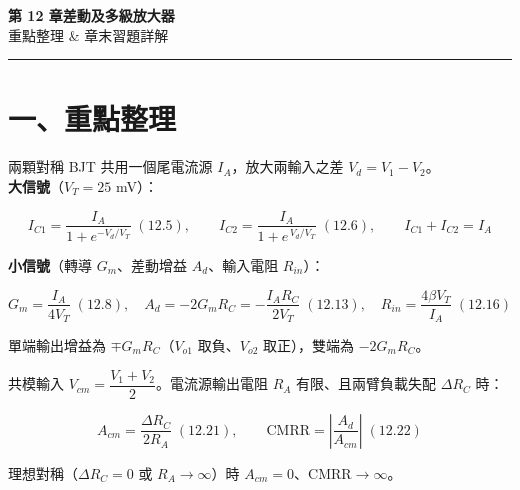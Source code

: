 \documentclass[12pt]{article}
\begin{document}
\begin{center}
{\Huge\bfseries\color{maincol} 第 12 章\quad 差動及多級放大器}\\[0.4em]
{\large\color{keycol} 重點整理 \;\&\; 章末習題詳解}
\end{center}
\vspace{0.4em}\hrule\vspace{1em}

\section*{一、重點整理}

\begin{keybox}
兩顆對稱 BJT 共用一個尾電流源 $I_A$，放大兩輸入之差 $V_d=V_1-V_2$。\\
\textbf{大信號}（$V_T=25$ mV）：
\begin{formulabox}
\[ I_{C1}=\frac{I_A}{1+e^{-V_d/V_T}}\;(12.5),\qquad
   I_{C2}=\frac{I_A}{1+e^{\,V_d/V_T}}\;(12.6),\qquad I_{C1}+I_{C2}=I_A \]
\end{formulabox}
\textbf{小信號}（轉導 $G_m$、差動增益 $A_d$、輸入電阻 $R_{in}$）：
\begin{formulabox}
\[ G_m=\frac{I_A}{4V_T}\;(12.8),\quad
   A_d=-2G_mR_C=-\frac{I_AR_C}{2V_T}\;(12.13),\quad
   R_{in}=\frac{4\beta V_T}{I_A}\;(12.16) \]
\end{formulabox}
單端輸出增益為 $\mp G_mR_C$（$V_{o1}$ 取負、$V_{o2}$ 取正），雙端為 $-2G_mR_C$。
\end{keybox}

\begin{keybox}
共模輸入 $V_{cm}=\dfrac{V_1+V_2}{2}$。電流源輸出電阻 $R_A$ 有限、且兩臂負載失配 $\Delta R_C$ 時：
\begin{formulabox}
\[ A_{cm}=\frac{\Delta R_C}{2R_A}\;(12.21),\qquad
   \mathrm{CMRR}=\left|\frac{A_d}{A_{cm}}\right|\;(12.22) \]
\end{formulabox}
理想對稱（$\Delta R_C=0$ 或 $R_A\to\infty$）時 $A_{cm}=0$、CMRR$\to\infty$。
\end{keybox}
\end{document}
